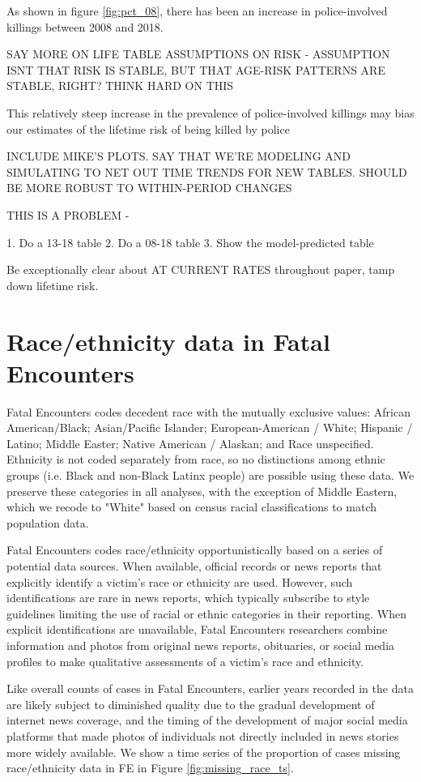 \documentclass{article}
\begin{document}
As shown in figure \ref{fig:pct_08}, there has been an increase in police-involved killings between 2008 and 2018. 

SAY MORE ON LIFE TABLE ASSUMPTIONS ON RISK - ASSUMPTION ISNT THAT RISK IS STABLE, BUT THAT AGE-RISK PATTERNS ARE STABLE, RIGHT? THINK HARD ON THIS

This relatively steep increase in the prevalence of police-involved killings may bias our estimates of the lifetime risk of being killed by police

INCLUDE MIKE'S PLOTS. SAY THAT WE'RE MODELING AND SIMULATING TO NET OUT TIME TRENDS FOR NEW TABLES. SHOULD BE MORE ROBUST TO WITHIN-PERIOD CHANGES

THIS IS A PROBLEM - 

1. Do a 13-18 table
2. Do a 08-18 table
3. Show the model-predicted table

Be exceptionally clear about AT CURRENT RATES throughout paper, tamp down lifetime risk. 

\section{Race/ethnicity data in Fatal Encounters}

Fatal Encounters codes decedent race with the mutually exclusive values: African American/Black; Asian/Pacific Islander; European-American / White; Hispanic / Latino; Middle Easter; Native American / Alaskan; and Race unspecified. Ethnicity is not coded separately from race, so no distinctions among ethnic groups (i.e. Black and non-Black Latinx people) are possible using these data. We preserve these categories in all analyses, with the exception of Middle Eastern, which we recode to "White" based on census racial classifications to match population data. 

Fatal Encounters codes race/ethnicity opportunistically based on a series of potential data sources. When available, official records or news reports that explicitly identify a victim's race or ethnicity are used. However, such identifications are rare in news reports, which typically subscribe to style guidelines limiting the use of racial or ethnic categories in their reporting. When explicit identifications are unavailable, Fatal Encounters researchers combine information and photos from original news reports, obituaries, or social media profiles to make qualitative assessments of a victim's race and ethnicity. 

Like overall counts of cases in Fatal Encounters, earlier years recorded in the data are likely subject to diminished quality due to the gradual development of internet news coverage, and the timing of the development of major social media platforms that made photos of individuals not directly included in news stories more widely available. We show a time series of the proportion of cases missing race/ethnicity data in FE in Figure \ref{fig:missing_race_ts}.
\end{document}
